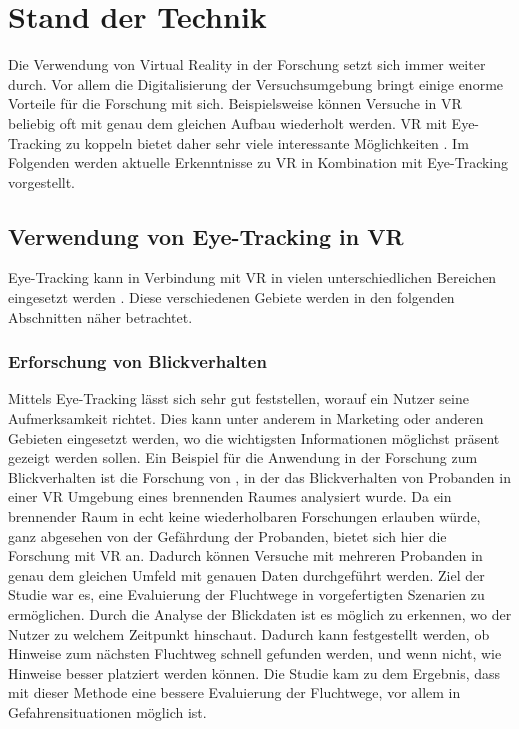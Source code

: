 
\chapter{Stand der Technik}
Die Verwendung von Virtual Reality in der Forschung setzt sich immer weiter durch. Vor allem die Digitalisierung der Versuchsumgebung bringt einige enorme Vorteile für die Forschung mit sich. Beispielsweise können Versuche in \ac{VR} beliebig oft mit genau dem gleichen Aufbau wiederholt werden. \ac{VR} mit Eye-Tracking zu koppeln bietet daher sehr viele interessante Möglichkeiten \cite{Clay_Koenig_Koenig_2019}. Im Folgenden werden aktuelle Erkenntnisse zu \ac{VR} in Kombination mit Eye-Tracking vorgestellt.

\section{Verwendung von Eye-Tracking in VR}
Eye-Tracking kann in Verbindung mit \ac{VR} in vielen unterschiedlichen Bereichen eingesetzt werden \cite{Clay_Koenig_Koenig_2019}. Diese verschiedenen Gebiete werden in den folgenden Abschnitten näher betrachtet.
\subsection{Erforschung von Blickverhalten}
Mittels Eye-Tracking lässt sich sehr gut feststellen, worauf ein Nutzer seine Aufmerksamkeit richtet. Dies kann unter anderem in Marketing \cite{C.Wang.2019} oder anderen Gebieten eingesetzt werden, wo die wichtigsten Informationen möglichst präsent gezeigt werden sollen. 
Ein Beispiel für die Anwendung in der Forschung zum Blickverhalten ist die Forschung von \citeauthor{P.Tian.2019}, in der das Blickverhalten von Probanden in einer \ac{VR} Umgebung eines brennenden Raumes analysiert wurde. Da ein brennender Raum in echt keine wiederholbaren Forschungen erlauben würde, ganz abgesehen von der Gefährdung der Probanden, bietet sich hier die Forschung mit \ac{VR} an. Dadurch können Versuche mit mehreren Probanden in genau dem gleichen Umfeld mit genauen Daten durchgeführt werden. Ziel der Studie war es, eine Evaluierung der Fluchtwege in vorgefertigten Szenarien zu ermöglichen. Durch die Analyse der Blickdaten ist es möglich zu erkennen, wo der Nutzer zu welchem Zeitpunkt hinschaut. Dadurch kann festgestellt werden, ob Hinweise zum nächsten Fluchtweg schnell gefunden werden, und wenn nicht, wie Hinweise besser platziert werden können. Die Studie kam zu dem Ergebnis, dass mit dieser Methode eine bessere Evaluierung der Fluchtwege, vor allem in Gefahrensituationen möglich ist. \cite{P.Tian.2019}

